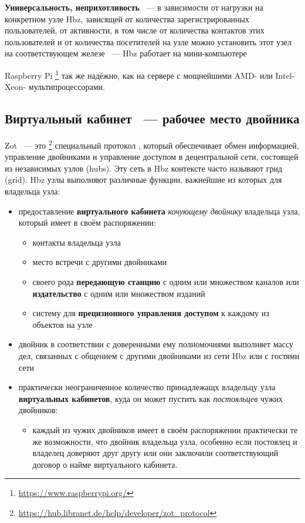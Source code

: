 \documentclass[10pt, a5paper]{article}
\begin{document}
\textbf{Универсальность, неприхотливость} ~--- в зависимости от нагрузки на конкретном узле Hbz, зависящей от количества зарегистрированных пользователей, от активности, в том числе от количества контактов этих пользователей и от количества посетителей на узле можно установить  этот узел на соответствующем железе ~--- Hbz работает на мини-компьютере {Raspberry Pi \footnote{\url{https://www.raspberrypi.org/}} так же надёжно, как на сервере с мощнейшими AMD- или Intel-Xeon- мультипроцессорами.

\subsection*{Виртуальный кабинет ~--- рабочее место двойника}

Zot ~--- это \footnote{\url{https://hub.libranet.de/help/developer/zot_protocol}} специальный протокол , который обеспечивает обмен информацией, управление двойниками и управление доступом в децентральной сети, состоящей из независимых узлов (hubs). Эту сеть в Hbz контексте часто называют грид (grid). Hbz узлы выполняют различные функции, важнейшие из которых для владельца узла:

\begin{itemize}
  \item предоставление \textbf{виртуального кабинета} \emph{кочующему двойнику} владельца узла, который имеет в своём распоряжении:\begin{itemize}
  \item контакты владельца узла
  \item место встречи с другими двойниками
  \item своего рода \textbf{передающую станцию} с одним или множеством каналов или \textbf{издательство} с одним или множеством изданий
  \item систему для \textbf{прецизионного управления доступом} к каждому из объектов на узле
\end{itemize}


  \item двойник в соответствии с доверенными ему полномочиями выполняет массу дел, связанных с общением с другими двойниками из сети Hbz или с гостями сети
  \item практически неограниченное количество принадлежащх владельцу узла \textbf{виртуальных кабинетов}, куда он может пустить как \emph{постояльцев} чужих двойников:
	\begin{itemize}
  	\item каждый из чужих двойников имеет в своём распоряжении практически те же возможности, что двойник владельца узла, особенно если постоялец и владелец доверяют друг другу или они заключили соответствующий договор о найме виртуального кабинета.
	\end{itemize}



\end{itemize}}
\end{document}
